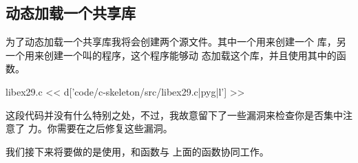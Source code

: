 \subsection{动态加载一个共享库}

为了动态加载一个共享库我将会创建两个源文件。其中一个用来创建一个
库，另一个用来创建一个叫的程序，这个程序能够动
态加载这个库，并且使用其中的函数。

\begin{code}{libex29.c}
<< d['code/c-skeleton/src/libex29.c|pyg|l'] >>
\end{code}

这段代码并没有什么特别之处，不过，我故意留下了一些漏洞来检查你是否集中注意了
力。你需要在之后修复这些漏洞。

我们接下来将要做的是使用，和函数与
上面的函数协同工作。

